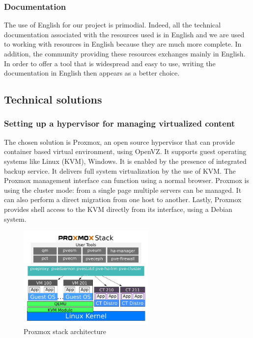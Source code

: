 \vspace{0.5cm}
\subsubsection{Documentation}
The use of English for our project is primodial. Indeed, all the technical
documentation associated with the resources used is in English and we are used
to working with resources in English because they are much more complete. In
addition, the community providing these resources exchanges mainly in English. In order
to offer a tool that is widespread and easy to use, writing the
documentation in English then appears as a better choice. \\


\pagebreak

\subsection{Technical solutions}

\vspace{1cm}
\subsubsection{Setting up a hypervisor for managing virtualized content}

The chosen solution is Proxmox, an open source hypervisor that can provide container based virtual environment, using OpenVZ.
It supports guest operating systems like Linux (KVM), Windows. It is enabled by the presence of integrated backup service.
It delivers full system virtualization by the use of KVM.
The Proxmox management interface can function using a normal browser.
Proxmox is using the cluster mode: from a single page multiple servers can be managed.
It can also perform a direct migration from one host to another.
Lastly, Proxmox provides shell access to the KVM directly from its interface, using a Debian system.

\begin{figure}[!h]
  \centering
  \includegraphics[width=0.6\textwidth]{images/proxmox-stack-example.jpg}
  \caption{Proxmox stack architecture}
  \label{Proxmox}
\end{figure}

